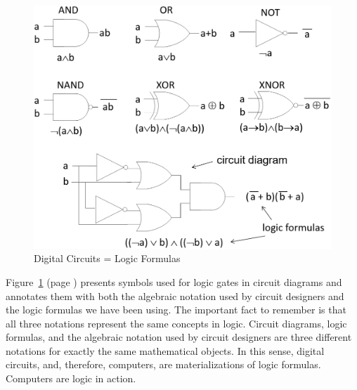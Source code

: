 \begin{figure}
\begin{center}
\includegraphics[scale=0.25]{images/LogicGates.png}
\end{center}
\caption{Digital Circuits = Logic Formulas}
\label{fig-02-logic-gates}
\end{figure}

Figure~\ref{fig-02-logic-gates} (page \pageref{fig-02-logic-gates})
presents symbols used for logic gates in circuit diagrams
and annotates them with both
the algebraic notation used by circuit designers
and the logic formulas we have been using.
The important fact to remember is that all three notations
represent the same concepts in logic. Circuit diagrams, logic formulas,
and the algebraic notation used by circuit designers are three
different notations for exactly the same mathematical objects.
In this sense, digital circuits, and, therefore, computers,
are materializations of logic formulas.
Computers are
logic in action.

